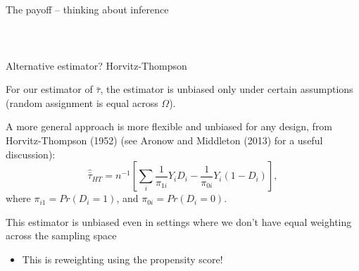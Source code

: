 \documentclass[notes,11pt, aspectratio=169]{beamer}
\newenvironment{wideitemize}{\itemize\addtolength{\itemsep}{10pt}}{\enditemize}
\begin{document}
\begin{frame}{The payoff -- thinking about inference}
\begin{columns}[T]
\begin{column}{.4\textwidth}
{\begin{tabular}{cccc}
      \bottomrule
      \end{tabular}
    }
  \end{column}%
\end{columns}
\end{frame}

\begin{frame}{Alternative estimator? Horvitz-Thompson}
  \begin{wideitemize}
  \item For our estimator of $\bar{\tau}$, the estimator is unbiased
    only under certain assumptions (random assignment is equal across
    $\Omega$).
  \item A more general approach is more flexible and unbiased for any
    design, from Horvitz-Thompson (1952) (see Aronow and Middleton
    (2013) for a useful discussion):
    \begin{equation}
      \hat{\bar{\tau}}_{HT} = n^{-1}\left[\sum_{i}\frac{1}{\pi_{1i}}Y_{i}D_{i} - \frac{1}{\pi_{0i}}Y_{i}(1-D_{i})\right],
    \end{equation}
    where $\pi_{i1} = Pr(D_{i} = 1)$, and $\pi_{0i} = Pr(D_{i} = 0)$.
  \item This estimator is unbiased even in settings where we don't have equal
    weighting across the sampling space
    \begin{itemize}
    \item This is reweighting using the propensity score!
    \end{itemize}
  \end{wideitemize}
\end{frame}
\end{document}
